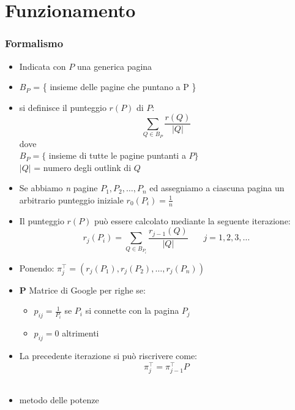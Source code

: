 \documentclass{beamer}
\begin{document}
\section{Funzionamento}
\begin{frame}
	\frametitle{Formalismo}
	\begin{itemize}
		\item Indicata con $P$ una generica pagina
		\item $B_P$ = \{ insieme delle pagine che puntano a P \}
		\item si definisce il punteggio $r(P)$ di $P$: $$\sum_{Q \in B_P}\frac{r(Q)}{|Q|}$$ dove \\ $B_P=\{$ insieme di tutte le pagine puntanti a $P\}$ \\ $|Q|$ = numero degli outlink di $Q$
	\end{itemize}
\end{frame}


\begin{frame}
	\begin{itemize}
		\item Se abbiamo \emph{n} pagine $P_1,P_2,\dots,P_n$ ed assegniamo a ciascuna pagina un arbitrario punteggio iniziale $r_0(P_i)=\frac{1}{n}$
		\item Il punteggio $r(P)$ può essere calcolato mediante la seguente iterazione: $$r_j(P_i)= \sum_{Q \in B_{P_i}}\frac{r_{j-1}(Q)}{|Q|} ~~~~~~~~ j=1,2,3,\dots$$
	\end{itemize}
\end{frame}



\begin{frame}
	\begin{itemize}
		\item Ponendo: $\pi_j^\intercal = (r_j(P_1),r_j(P_2),\dots,r_j(P_n))$\\
		\item \textbf{P} Matrice di Google per righe se:
		\begin{itemize}
			\item $p_{ij}= \frac{1}{P_i}$ se $P_i$ si connette con la pagina $P_j$
			\item $p_{ij}=0$ altrimenti
		\end{itemize}
		\item La precedente iterazione si può riscrivere come: $$ \pi_j^\intercal = \pi_{j-1}^\intercal P$$\\
		\item metodo delle potenze
	\end{itemize}
\end{frame}
\end{document}
